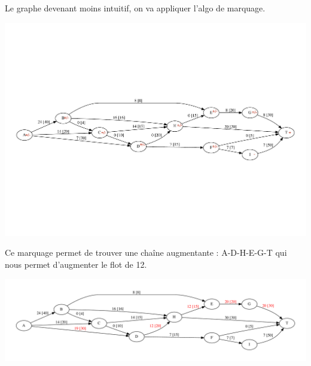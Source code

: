 \begin{frame}{}
    Le graphe devenant moins intuitif, on va appliquer l'algo de marquage.
    \begin{center}
        \includegraphics[width=\textwidth]{tutorials/pcc/figs/reseau-4m.pdf}
    \end{center}
   
\end{frame}

\begin{frame}{}
    Ce marquage permet de trouver une chaîne augmentante : A-D-H-E-G-T qui nous permet d'augmenter le flot de 12.
    \begin{center}
        \includegraphics[width=\textwidth]{tutorials/pcc/figs/reseau-5.pdf}
    \end{center}
   
\end{frame}

